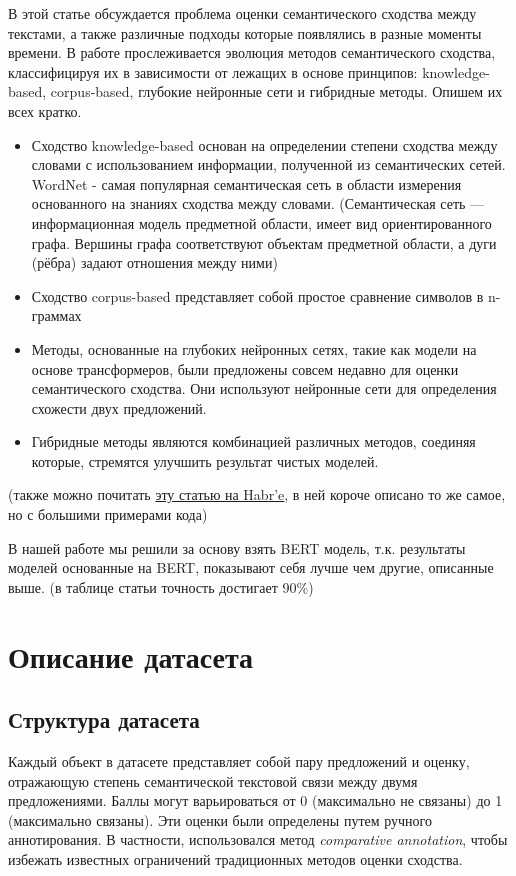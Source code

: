 \documentclass[12pt]{article}
\begin{document}
\begin{enumerate}
	В этой статье обсуждается проблема оценки семантического сходства между текстами, а также различные подходы которые появлялись в разные моменты времени. В работе прослеживается эволюция методов семантического сходства, классифицируя их в зависимости от лежащих в основе принципов: knowledge-based, corpus-based, глубокие нейронные сети и гибридные методы.
	Опишем их всех кратко.
	\begin{itemize}
		\item Сходство knowledge-based основан на определении степени сходства между словами с использованием информации, полученной из семантических сетей. WordNet - самая популярная семантическая сеть в области измерения основанного на знаниях сходства между словами. (Семантическая сеть — информационная модель предметной области, имеет вид ориентированного графа. Вершины графа соответствуют объектам предметной области, а дуги (рёбра) задают отношения между ними)
		\item Сходство corpus-based представляет собой простое сравнение символов в n-граммах
		\item Методы, основанные на глубоких нейронных сетях, такие как модели на основе трансформеров, были предложены совсем недавно для оценки семантического сходства. Они используют нейронные сети для определения схожести двух предложений.
		\item Гибридные методы являются комбинацией различных методов, соединяя которые, стремятся улучшить результат чистых моделей.
	\end{itemize}
	(также можно почитать \href{https://habr.com/ru/companies/skillfactory/articles/566414/}{эту статью на Habr'e}, в ней короче описано то же самое, но с большими примерами кода)
	
	В нашей работе мы решили за основу взять BERT модель, т.к. результаты моделей основанные на BERT, показывают себя лучше чем другие, описанные выше. (в таблице статьи точность достигает 90\%)
\end{enumerate}



\newpage

\section{Описание датасета}
\subsection{Структура датасета}
Каждый объект в датасете представляет собой пару предложений и оценку, отражающую степень семантической текстовой связи между двумя предложениями. Баллы могут варьироваться от 0 (максимально не связаны) до 1 (максимально связаны). Эти оценки были определены путем ручного аннотирования. В частности, использовался метод \textit{comparative annotation}, чтобы избежать известных ограничений традиционных методов оценки сходства.
\end{document}
